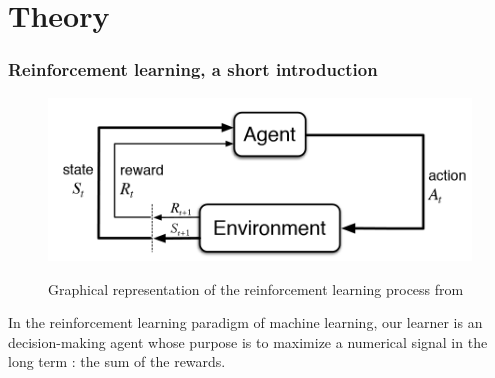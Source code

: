 \documentclass[14pt,a4paper]{article}
\theoremstyle{definition}
\begin{document}
\tableofcontents
{}
\newpage
{}


%
%
%
%
%




\part*{Theory}
\section{Reinforcement learning, a short introduction}

\begin{figure}[H]
\centering
\includegraphics[scale=0.5]{img/RL_graph.png}
\label{RL}
\caption{Graphical representation of the reinforcement learning process from \citep{Sutton}}
\end{figure}

In the reinforcement learning paradigm of machine learning, our learner is an decision-making agent whose purpose is to maximize a numerical signal in the long term : the sum of the rewards. 
\end{document}
